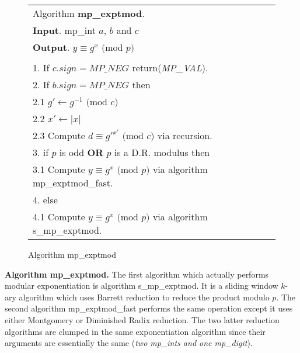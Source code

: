 \documentclass[b5paper]{book}
\begin{document}
\begin{figure}[!here]
\begin{small}
\begin{center}
\begin{tabular}{l}
\hline Algorithm \textbf{mp\_exptmod}. \\
\textbf{Input}.   mp\_int $a$, $b$ and $c$ \\
\textbf{Output}.  $y \equiv g^x \mbox{ (mod }p\mbox{)}$ \\
\hline \\
1.  If $c.sign = MP\_NEG$ return(\textit{MP\_VAL}). \\
2.  If $b.sign = MP\_NEG$ then \\
\hspace{3mm}2.1  $g' \leftarrow g^{-1} \mbox{ (mod }c\mbox{)}$ \\
\hspace{3mm}2.2  $x' \leftarrow \vert x \vert$ \\
\hspace{3mm}2.3  Compute $d \equiv g'^{x'} \mbox{ (mod }c\mbox{)}$ via recursion. \\
3.  if $p$ is odd \textbf{OR} $p$ is a D.R. modulus then \\
\hspace{3mm}3.1  Compute $y \equiv g^{x} \mbox{ (mod }p\mbox{)}$ via algorithm mp\_exptmod\_fast. \\
4.  else \\
\hspace{3mm}4.1  Compute $y \equiv g^{x} \mbox{ (mod }p\mbox{)}$ via algorithm s\_mp\_exptmod. \\
\hline
\end{tabular}
\end{center}
\end{small}
\caption{Algorithm mp\_exptmod}
\end{figure}

\textbf{Algorithm mp\_exptmod.}
The first algorithm which actually performs modular exponentiation is algorithm s\_mp\_exptmod.  It is a sliding window $k$-ary algorithm 
which uses Barrett reduction to reduce the product modulo $p$.  The second algorithm mp\_exptmod\_fast performs the same operation 
except it uses either Montgomery or Diminished Radix reduction.  The two latter reduction algorithms are clumped in the same exponentiation
algorithm since their arguments are essentially the same (\textit{two mp\_ints and one mp\_digit}).  
\end{document}
